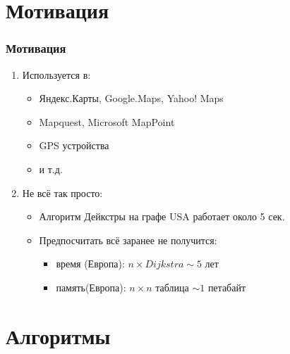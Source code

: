 \documentclass{beamer}
\begin{document}

\section{Мотивация}

\begin{frame}
\frametitle{Мотивация}
\begin{enumerate}

\item Используется в:

  \begin{itemize}
  \item Яндекс.Карты, Google.Maps, Yahoo! Maps
  \item Mapquest, Microsoft MapPoint
  \item GPS устройства
  \item и т.д.
  \end{itemize}

\item Не всё так просто:

  \begin{itemize}
  \item Алгоритм Дейкстры на графе USA работает около 5 сек.
  \item Предпосчитать всё заранее не получится:
  	\begin{itemize}	
    \item время (Европа): $n \times Dijkstra \sim 5$ лет 
    \item память(Европа): $n \times n$ таблица $\sim 1$ петабайт  
    \end{itemize}
  \end{itemize}
  
\end{enumerate}

\end{frame}


\section{Алгоритмы}

\end{document}
